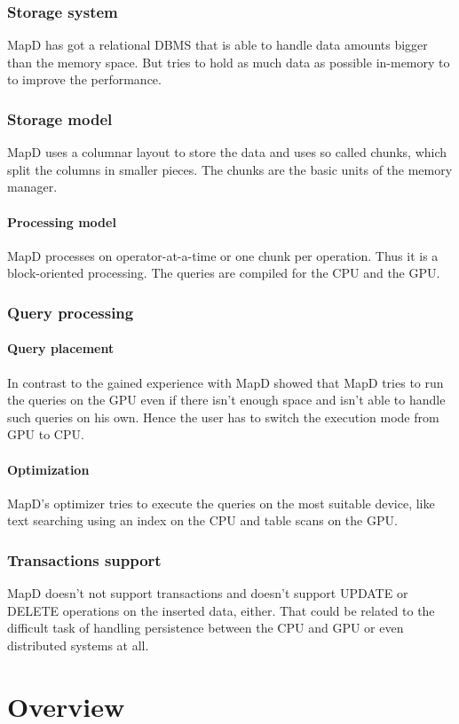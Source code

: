 \subsubsection{Storage system} MapD has got a relational DBMS that is able to handle data amounts bigger than the memory space.
But tries to hold as much data as possible in-memory to to improve the performance.
\subsubsection{Storage model} MapD uses a columnar layout to store the data and uses so called chunks, which split the columns in smaller pieces.
The chunks are the basic units of the memory manager.
\paragraph{Processing model} MapD processes on operator-at-a-time or one chunk per operation. Thus it is a block-oriented processing.
The queries are compiled for the CPU and the GPU.
\subsubsection{Query processing}
\paragraph{Query placement} In contrast to \cite{bress2014gpu} the gained experience with MapD showed that MapD tries to run the queries on the GPU even if there isn't enough space and isn't able to handle such queries on his own.
Hence the user has to switch the execution mode from GPU to CPU.
\paragraph{Optimization} MapD's optimizer tries to execute the queries on the most suitable device, like text searching using an index on the CPU and table scans on the GPU.
\subsubsection{Transactions support} MapD doesn't not support transactions and doesn't support UPDATE or DELETE operations on the inserted data, either.
That could be related to the difficult task of handling persistence between the CPU and GPU or even distributed systems at all.


\newpage
\section{Overview}


